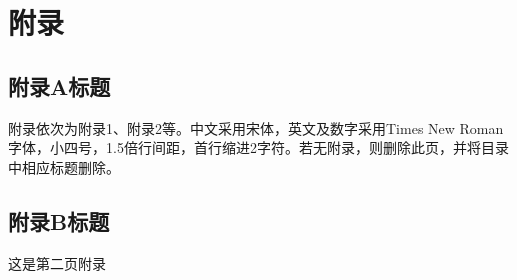 \appendix

\chapter*{附录}

\pagestyle{plain}

\setcounter{section}{0}
\setcounter{figure}{0}
\setcounter{table}{0}
\setcounter{equation}{0}
\setcounter{algorithm}{0} %

\renewcommand{\thesection}{\Alph{section}}
\renewcommand{\thefigure}{\Alph{section}-\arabic{figure}}
\renewcommand{\thetable}{\Alph{section}-\arabic{table}}
\renewcommand{\theequation}{\Alph{section}-\arabic{equation}}
\renewcommand{\thealgorithm}{\Alph{section}-\arabic{algorithm}} %

\section{附录A标题} %
附录依次为附录1、附录2等。中文采用宋体，英文及数字采用Times New Roman字体，小四号，1.5倍行间距，首行缩进2字符。若无附录，则删除此页，并将目录中相应标题删除。

\newpage
\section{附录B标题}
这是第二页附录
